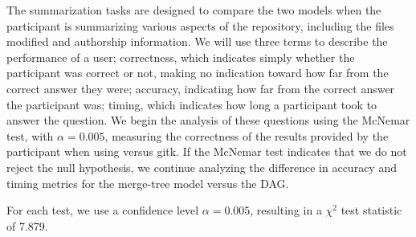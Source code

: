The summarization tasks are designed to compare the two models when the
participant is summarizing various aspects of the repository, including
the files modified and authorship information. We will use three terms
to describe the performance of a user; correctness, which indicates
simply whether the participant was correct or not, making no indication
toward how far from the correct answer they were; accuracy, indicating
how far from the correct answer the participant was; timing, which
indicates how long a participant took to answer the question. We begin
the analysis of these questions using the McNemar test, with $\alpha =
0.005$, measuring the correctness of the results provided by the
participant when using \tool versus gitk.
If the McNemar test indicates that we do not reject the null hypothesis,
we continue analyzing the difference in accuracy and timing metrics for
the merge-tree model versus the DAG.

For each test, we use a confidence level $\alpha = 0.005$, resulting in
a $\chi^2$ test statistic of 7.879.


